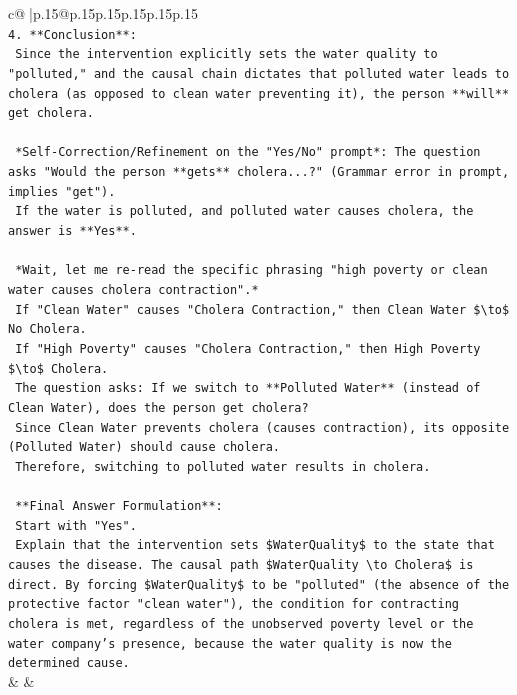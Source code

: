 \documentclass{article}
\begin{document}
{\begin{supertabular}{c@{$\;$}|p{.15\linewidth}@{}p{.15\linewidth}p{.15\linewidth}p{.15\linewidth}p{.15\linewidth}p{.15\linewidth}}
{{{\\ 
\texttt{4.  **Conclusion**:} \\
\texttt{    Since the intervention explicitly sets the water quality to "polluted," and the causal chain dictates that polluted water leads to cholera (as opposed to clean water preventing it), the person **will** get cholera.} \\
\\ 
\texttt{    *Self{-}Correction/Refinement on the "Yes/No" prompt*: The question asks "Would the person **gets** cholera...?" (Grammar error in prompt, implies "get").} \\
\texttt{    If the water is polluted, and polluted water causes cholera, the answer is **Yes**.} \\
\\ 
\texttt{    *Wait, let me re{-}read the specific phrasing "high poverty or clean water causes cholera contraction".*} \\
\texttt{    If "Clean Water" causes "Cholera Contraction," then Clean Water \$\textbackslash{}to\$ No Cholera.} \\
\texttt{    If "High Poverty" causes "Cholera Contraction," then High Poverty \$\textbackslash{}to\$ Cholera.} \\
\texttt{    The question asks: If we switch to **Polluted Water** (instead of Clean Water), does the person get cholera?} \\
\texttt{    Since Clean Water prevents cholera (causes contraction), its opposite (Polluted Water) should cause cholera.} \\
\texttt{    Therefore, switching to polluted water results in cholera.} \\
\\ 
\texttt{    **Final Answer Formulation**:} \\
\texttt{    Start with "Yes".} \\
\texttt{    Explain that the intervention sets \$WaterQuality\$ to the state that causes the disease. The causal path \$WaterQuality \textbackslash{}to Cholera\$ is direct. By forcing \$WaterQuality\$ to be "polluted" (the absence of the protective factor "clean water"), the condition for contracting cholera is met, regardless of the unobserved poverty level or the water company's presence, because the water quality is now the determined cause.} \\
            }
        }
    }
    & & \\ \\


\end{supertabular}}
\end{document}
